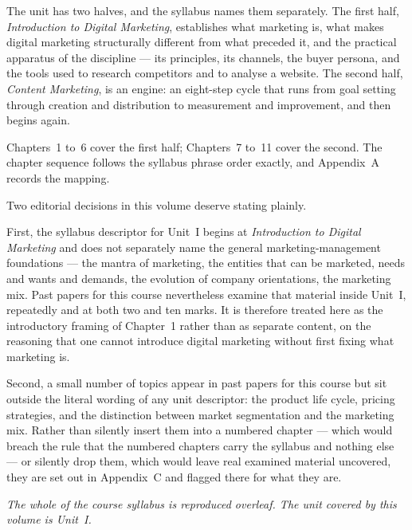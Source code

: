 \documentclass{MMTextbook}
\begin{document}
The unit has two halves, and the syllabus names them separately. The first
half, \emph{Introduction to Digital Marketing}, establishes what marketing is,
what makes digital marketing structurally different from what preceded it, and
the practical apparatus of the discipline --- its principles, its channels, the
buyer persona, and the tools used to research competitors and to analyse a
website. The second half, \emph{Content Marketing}, is an engine: an
eight-step cycle that runs from goal setting through creation and distribution
to measurement and improvement, and then begins again.

Chapters~1 to~6 cover the first half; Chapters~7 to~11 cover the second. The
chapter sequence follows the syllabus phrase order exactly, and
Appendix~A records the mapping.

Two editorial decisions in this volume deserve stating plainly.

First, the syllabus descriptor for Unit~I begins at \emph{Introduction to
Digital Marketing} and does not separately name the general
marketing-management foundations --- the mantra of marketing, the entities that
can be marketed, needs and wants and demands, the evolution of company
orientations, the marketing mix. Past papers for this course nevertheless
examine that material inside Unit~I, repeatedly and at both two and ten marks.
It is therefore treated here as the introductory framing of Chapter~1 rather
than as separate content, on the reasoning that one cannot introduce digital
marketing without first fixing what marketing is.

Second, a small number of topics appear in past papers for this course but sit
outside the literal wording of any unit descriptor: the product life cycle,
pricing strategies, and the distinction between market segmentation and the
marketing mix. Rather than silently insert them into a numbered chapter --- which
would breach the rule that the numbered chapters carry the syllabus and nothing
else --- or silently drop them, which would leave real examined material
uncovered, they are set out in Appendix~C and flagged there for what they are.

\vspace{12pt}
\noindent\emph{The whole of the course syllabus is reproduced overleaf. The
unit covered by this volume is Unit~I.}




\cleardoublepage
{}
\tableofcontents
\cleardoublepage
\listoffigures
\cleardoublepage
\listoftables
\end{document}
